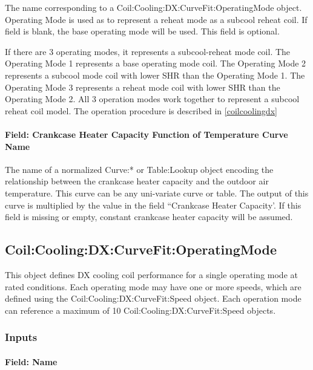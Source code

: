 The name corresponding to a Coil:Cooling:DX:CurveFit:OperatingMode object. Operating Mode is used as to represent a reheat mode as a subcool reheat coil. If field is blank, the base operating mode will be used. This field is optional.

If there are 3 operating modes, it represents a subcool-reheat mode coil. The Operating Mode 1 represents a base operating mode coil. The Operating Mode 2 represents a subcool mode coil with lower SHR than the Operating Mode 1. The Operating Mode 3 represents a reheat mode coil with lower SHR than the Operating Mode 2. All 3 operation modes work together to represent a subcool reheat coil model. The operation procedure is described in \ref{coilcoolingdx}  

\paragraph{Field: Crankcase Heater Capacity Function of Temperature Curve Name}\label{outdoor-temperature-dependent-crankcase-heater-capacity-curve-name-0}

The name of a normalized Curve:* or Table:Lookup object encoding the
relationship between the crankcase heater capacity and the outdoor air
temperature. This curve can be any uni-variate curve or table. The output of
this curve is multiplied by the value in the field ``Crankcase Heater Capacity'.
If this field is missing or empty, constant crankcase heater capacity will be
assumed.

\subsection{Coil:Cooling:DX:CurveFit:OperatingMode}\label{coilcoolingdxcurvefitoperatingmode}

This object defines DX cooling coil performance for a single operating mode at rated conditions. Each operating mode may have one or more speeds, which are defined using the Coil:Cooling:DX:CurveFit:Speed object. Each operation mode can reference a maximum of 10 Coil:Cooling:DX:CurveFit:Speed objects.

\subsubsection{Inputs}\label{inputs-03}

\paragraph{Field: Name}\label{field-name-03}


